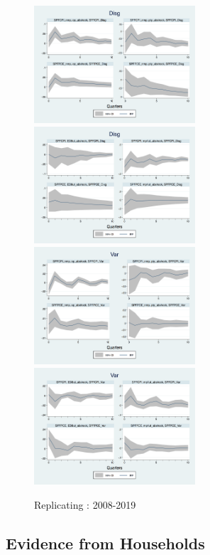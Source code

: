 \documentclass[]{article}
\begin{document}
\begin{figure}[ht]
	\smallskip
	\includegraphics[width=6cm]{figures/SPFDisg_ab_ashocks_nmp_post2007.png} 
	\includegraphics[width=6cm]{figures/SPFDisg_ab_ashocks_post2007.png} \\
	\smallskip 
	\includegraphics[width=6cm]{figures/SPFVar_ab_ashocks_nmp_post2007.png} 
	\includegraphics[width=6cm]{figures/SPFVar_ab_ashocks_post2007.png} 
	\caption{ Replicating \citet{coibion2012can}: 2008-2019}
	\label{ReplicateCoibionpost2007}
\end{figure}

\subsection{Evidence from Households}
\end{document}

